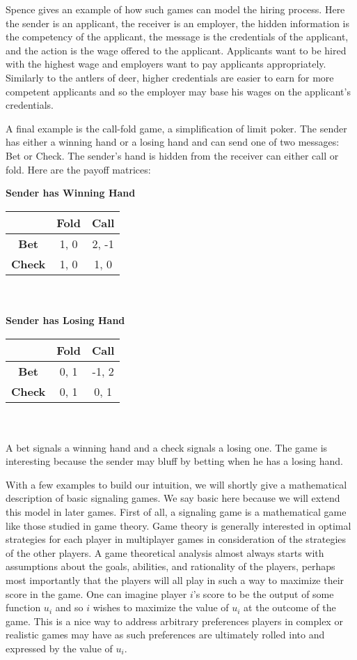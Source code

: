 \documentclass{article}
\begin{document}
Spence \cite{spence1} gives an example of how such games can model the hiring process. Here the sender is an applicant, the receiver is an employer, the hidden information is the competency of the applicant, the message is the credentials of the applicant, and the action is the wage offered to the applicant. Applicants want to be hired with the highest wage and employers want to pay applicants appropriately. Similarly to the antlers of deer, higher credentials are easier to earn for more competent applicants and so the employer may base his wages on the applicant's credentials.

A final example is the call-fold game, a simplification of limit poker. The sender has either a winning hand or a losing hand and can send one of two messages: Bet or Check. The sender's hand is hidden from the receiver can either call or fold. Here are the payoff matrices:

\textbf{Sender has Winning Hand}\\
\begin{tabular}{c | c | c} & \textbf{Fold} & \textbf{Call} \\ \hline \textbf{Bet} & 1, 0 & 2, -1 \\ \hline  \textbf{Check} & 1, 0 & 1, 0 \end{tabular}
\\ \\
\textbf{Sender has Losing Hand}\\
\begin{tabular}{c | c | c} & \textbf{Fold} & \textbf{Call} \\ \hline \textbf{Bet} & 0, 1 & -1, 2 \\ \hline  \textbf{Check} & 0, 1 & 0, 1 \end{tabular}
\\ \\

A bet signals a winning hand and a check signals a losing one. The game is interesting because the sender may bluff by betting when he has a losing hand. 

With a few examples to build our intuition, we will shortly give a mathematical description of basic signaling games. We say basic here because we will extend this model in later games. First of all, a signaling game is a mathematical game like those studied in game theory. Game theory is generally interested in optimal strategies for each player in multiplayer games in consideration of the strategies of the other players. A game theoretical analysis almost always starts with assumptions about the goals, abilities, and rationality of the players, perhaps most importantly that the players will all play in such a way to maximize their score in the game. One can imagine player $i$'s score to be the output of some function $u_i$ and so $i$ wishes to maximize the value of $u_i$ at the outcome of the game. This is a nice way to address arbitrary preferences players in complex or realistic games may have as such preferences are ultimately rolled into and expressed by the value of $u_i$. 
\end{document}
